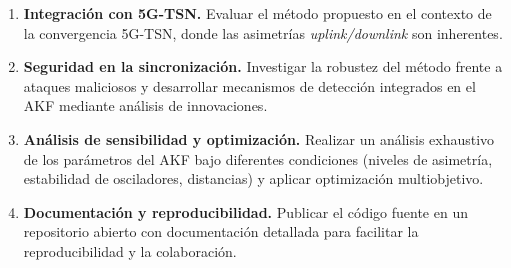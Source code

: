 \begin{enumerate}
\item \textbf{Integración con 5G-TSN.} Evaluar el método propuesto en el contexto de la convergencia 5G-TSN, donde las asimetrías \textit{uplink/downlink} son inherentes.

\item \textbf{Seguridad en la sincronización.} Investigar la robustez del método frente a ataques maliciosos y desarrollar mecanismos de detección integrados en el AKF mediante análisis de innovaciones.

\item \textbf{Análisis de sensibilidad y optimización.} Realizar un análisis exhaustivo de los parámetros del AKF bajo diferentes condiciones (niveles de asimetría, estabilidad de osciladores, distancias) y aplicar optimización multiobjetivo.

\item \textbf{Documentación y reproducibilidad.} Publicar el código fuente en un repositorio abierto con documentación detallada para facilitar la reproducibilidad y la colaboración.
\end{enumerate}
